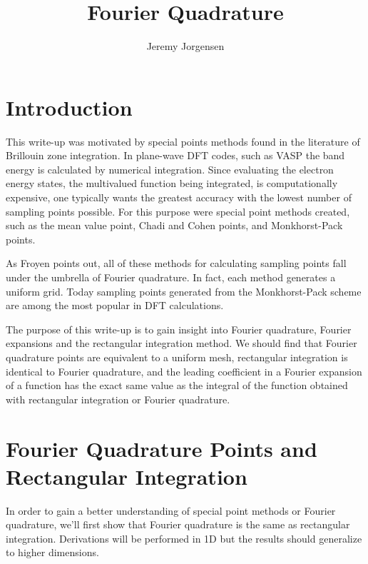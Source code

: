 \documentclass[preprint, amsmath, amssymb]{revtex4-1}
\begin{document}
\title{Fourier Quadrature}
\author{Jeremy Jorgensen}
\maketitle

\section{Introduction}
This write-up was motivated by special points methods found in the literature of Brillouin zone integration. In plane-wave DFT codes, such as VASP \cite{kresse1993ab, kresse1994ab, kresse1996efficiency, kresse1996efficient} the band energy is calculated by numerical integration. Since evaluating the electron energy states, the multivalued function being integrated, is computationally expensive, one typically wants the greatest accuracy with the lowest number of sampling points possible. For this purpose were special point methods created, such as the mean value point\cite{baldereschi1973mean}, Chadi and Cohen points\cite{chadi1973special}, and Monkhorst-Pack points\cite{monkhorst1976special}.

As Froyen points out, all of these methods for calculating sampling points fall under the umbrella of Fourier quadrature\cite{froyen1989brillouin}. In fact, each method generates a uniform grid. Today sampling points generated from the Monkhorst-Pack scheme are among the most popular in DFT calculations.

The purpose of this write-up is to gain insight into Fourier quadrature, Fourier expansions and the rectangular integration method. We should find that Fourier quadrature points are equivalent to a uniform mesh, rectangular integration is identical to Fourier quadrature, and the leading coefficient in a Fourier expansion of a function has the exact same value as the integral of the function obtained with rectangular integration or Fourier quadrature.

\section{Fourier Quadrature Points and Rectangular Integration}
In order to gain a better understanding of special point methods or Fourier quadrature, we'll first show that Fourier quadrature is the same as rectangular integration. Derivations will be performed in 1D but the results should generalize to higher dimensions.
\end{document}
